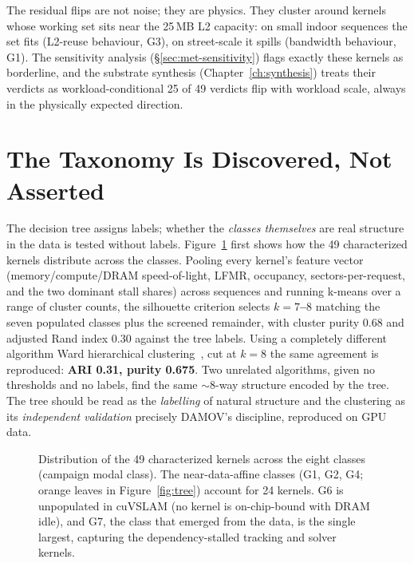 The residual flips are not noise; they are physics. They cluster around kernels whose working set sits near the 25\,MB L2 capacity: on small indoor sequences the set fits (L2-reuse behaviour, G3), on street-scale it spills (bandwidth behaviour, G1). The sensitivity analysis (\S\ref{sec:met-sensitivity}) flags exactly these kernels as borderline, and the substrate synthesis (Chapter~\ref{ch:synthesis}) treats their verdicts as workload-conditional 25 of 49 verdicts flip with workload scale, always in the physically expected direction.

\section{The Taxonomy Is Discovered, Not Asserted}
\label{sec:char-clustering}

The decision tree assigns labels; whether the \emph{classes themselves} are real structure in the data is tested without labels. Figure~\ref{fig:taxonomy} first shows how the 49 characterized kernels distribute across the classes. Pooling every kernel's feature vector (memory/compute/DRAM speed-of-light, LFMR, occupancy, sectors-per-request, and the two dominant stall shares) across sequences and running k-means over a range of cluster counts, the silhouette criterion selects \textbf{$k = 7$--$8$} matching the seven populated classes plus the screened remainder, with cluster purity 0.68 and adjusted Rand index 0.30 against the tree labels. Using a completely different algorithm Ward hierarchical clustering~\cite{ward1963}, cut at $k{=}8$ the same agreement is reproduced: \textbf{ARI 0.31, purity 0.675}. Two unrelated algorithms, given no thresholds and no labels, find the same $\sim$8-way structure encoded by the tree. The tree should be read as the \emph{labelling} of natural structure and the clustering as its \emph{independent validation} precisely DAMOV's discipline, reproduced on GPU data.

\begin{figure}[t]
\centering
{}
\vspace{-2mm}
\caption[Kernel distribution across the taxonomy.]{Distribution of the 49
characterized kernels across the eight classes (campaign modal class). The
near-data-affine classes (G1, G2, G4; orange leaves in Figure~\ref{fig:tree})
account for 24 kernels. G6 is unpopulated in cuVSLAM (no kernel is on-chip-bound
with DRAM idle), and G7, the class that emerged from the data, is the single
largest, capturing the dependency-stalled tracking and solver kernels.}
\label{fig:taxonomy}
\end{figure}

